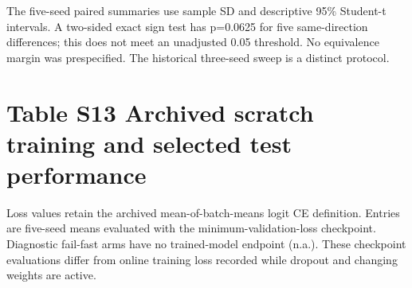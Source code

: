 \documentclass[11pt,a4paper]{article}
\begin{document}
The five-seed paired summaries use sample SD and descriptive 95\% Student-t intervals. A two-sided exact sign test has p=0.0625 for five same-direction differences; this does not meet an unadjusted 0.05 threshold. No equivalence margin was prespecified. The historical three-seed sweep is a distinct protocol.


\section{Table S13 Archived scratch training and selected test performance}\label{table-s13-archived-scratch-training-and-selected-test-performance}

Loss values retain the archived mean-of-batch-means logit CE definition. Entries are five-seed means evaluated with the minimum-validation-loss checkpoint. Diagnostic fail-fast arms have no trained-model endpoint (n.a.). These checkpoint evaluations differ from online training loss recorded while dropout and changing weights are active.
\end{document}
